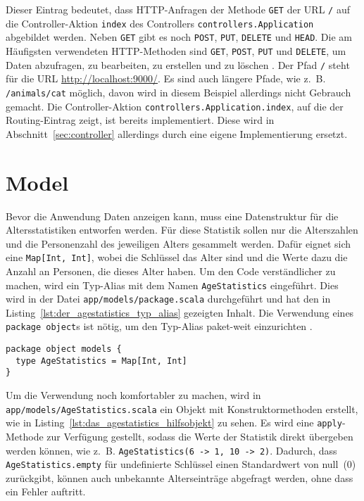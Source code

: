 Dieser Eintrag bedeutet, dass HTTP-Anfragen der Methode \lstinline|GET| der URL \lstinline|/| auf die Controller-Aktion \lstinline|index| des Controllers \lstinline[breaklines=true]|controllers.Application| abgebildet werden.
Neben \lstinline|GET| gibt es noch \lstinline|POST|, \lstinline|PUT|, \lstinline|DELETE| und \lstinline|HEAD|.
Die am Häufigsten verwendeten HTTP-Methoden sind \lstinline|GET|, \lstinline|POST|, \lstinline|PUT| und \lstinline|DELETE|, um Daten abzufragen, zu bearbeiten, zu erstellen und zu löschen \cite[vgl.][S.~7]{play_for_scala}.
Der Pfad \lstinline|/| steht für die URL \url{http://localhost:9000/}.
Es sind auch längere Pfade, wie z.~B. \lstinline|/animals/cat| möglich, davon wird in diesem Beispiel allerdings nicht Gebrauch gemacht.
Die Controller-Aktion \lstinline|controllers.Application.index|, auf die der Routing-Eintrag zeigt, ist bereits implementiert.
Diese wird in Abschnitt~\ref{sec:controller} allerdings durch eine eigene Implementierung ersetzt.



\section{Model} %
\label{sec:model}

Bevor die Anwendung Daten anzeigen kann, muss eine Datenstruktur für die Altersstatistiken entworfen werden.
Für diese Statistik sollen nur die Alterszahlen und die Personenzahl des jeweiligen Alters gesammelt werden.
Dafür eignet sich eine \lstinline|Map[Int, Int]|, wobei die Schlüssel das Alter sind und die Werte dazu die Anzahl an Personen, die dieses Alter haben.
Um den Code verständlicher zu machen, wird ein Typ-Alias mit dem Namen \lstinline|AgeStatistics| eingeführt.
Dies wird in der Datei \lstinline[language=sh]|app/models/package.scala| durchgeführt und hat den in Listing~\ref{lst:der_agestatistics_typ_alias} gezeigten Inhalt.
Die Verwendung eines \lstinline|package object|s ist nötig, um den Typ-Alias paket-weit einzurichten \cite[vgl.][]{package_objects}.

\begin{lstlisting}[caption=Der AgeStatistics-Typ-Alias, label=lst:der_agestatistics_typ_alias]
package object models {
  type AgeStatistics = Map[Int, Int]
}
\end{lstlisting}

Um die Verwendung noch komfortabler zu machen, wird in \lstinline|app/models/AgeStatistics.scala| ein Objekt mit Konstruktormethoden erstellt, wie in Listing~\ref{lst:das_agestatistics_hilfsobjekt} zu sehen.
Es wird eine \lstinline|apply|-Methode zur Verfügung gestellt, sodass die Werte der Statistik direkt übergeben werden können, wie z.~B. \lstinline|AgeStatistics(6 -> 1, 10 -> 2)|.
Dadurch, dass \lstinline|AgeStatistics.empty| für undefinierte Schlüssel einen Standardwert von null~(0) zurückgibt, können auch unbekannte Alterseinträge abgefragt werden, ohne dass ein Fehler auftritt.

